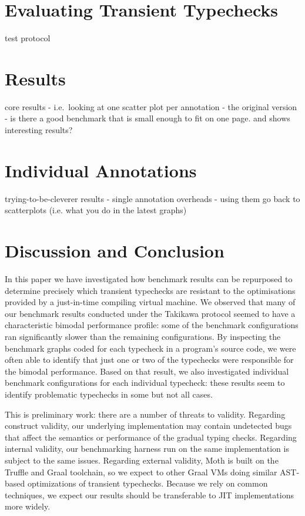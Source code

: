 \documentclass[sigplan,10pt,review,screen]{acmart}\settopmatter{printfolios=true}
\begin{document}
\section{Evaluating Transient Typechecks}
\label{s-eval}

test protocol

\section{Results}
\label{s-overall}

core results - i.e.\ looking at one scatter plot per annotation - the original version
   - is there a good benchmark that is small enough to fit on one page. and shows interesting results?


\section{Individual Annotations}
\label{s-individual}

   trying-to-be-cleverer results
  - single annotation overheads
  - using them go back to scatterplots (i.e. what you do in the latest graphs) 

\section{Discussion and Conclusion}
\label{s-concl}

In this paper we have investigated how benchmark results can be
repurposed to determine precisely which transient typechecks are
resistant to the optimisations provided by a just-in-time compiling
virtual machine.  We observed that many of our benchmark results
conducted under the Takikawa protocol 
seemed to have a characteristic bimodal performance profile: some
of the benchmark configurations ran significantly slower than
the remaining configurations. By inspecting the benchmark graphs coded
for each typecheck in a program's source code, we were often able to
identify that just one or two of the typechecks were responsible for
the bimodal performance.  Based on that result, we also investigated
individual benchmark configurations for each individual typecheck:
these results seem to identify problematic typechecks in some but not
all cases. 

This is preliminary work: there are a number of threats to validity. 
Regarding construct validity, 
our underlying
implementation may contain undetected bugs that affect the semantics
or performance of the gradual typing checks. Regarding internal
validity,
our benchmarking harness run on the same implementation is
subject to the same issues. Regarding external validity, 
Moth is built
on the Truffle and Graal toolchain, so we expect
to other Graal
VMs doing similar AST-based optimizations of transient typechecks.
Because we rely on common techniques, 
we expect our results should be transferable to JIT implementations
more widely.
\end{document}
